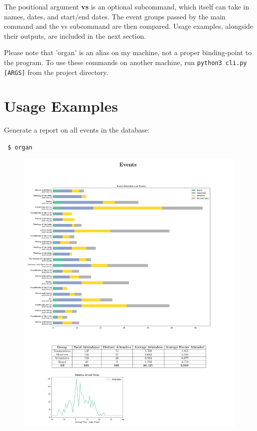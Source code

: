\documentclass[12pt]{article}
\begin{document}
The positional argument \textbf{vs} is an optional subcommand, which itself can take in names, dates, and start/end dates.
The event groups passed by the main command and the vs subcommand are then compared.
Usage examples, alongside their outputs, are included in the next section.

Please note that 'organ' is an alias on my machine, not a proper binding-point to the program.
To use these commands on another machine, run \texttt{python3 cli.py [ARGS]} from the project directory.


\section*{Usage Examples}
Generate a report on all events in the database:

\texttt{ \$ organ}
\begin{figure}[H]
    \centering
    \includegraphics[width=5.3in]{./media/all.pdf}
\end{figure}
\pagebreak
 
\end{document}
